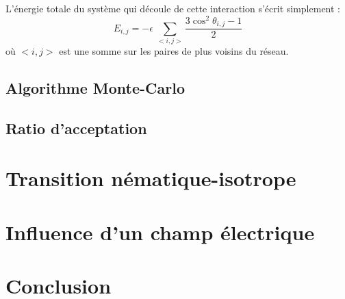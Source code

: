 \documentclass[11pt,a4paper]{article}
\numberwithin{equation}{section}
\begin{document}
L'énergie totale du système qui découle de cette interaction s'écrit simplement :
\begin{equation}
E_{i,j} = - \epsilon\ \sum_{<i,j>} \frac{3\cos^2\theta_{i,j}-1}{2}
\end{equation}
où $<i,j>$ est une somme sur les paires de plus voisins du réseau.

\subsection{Algorithme Monte-Carlo}


\subsection{Ratio d'acceptation}


\newpage
\section{Transition nématique-isotrope}




\newpage
\section{Influence d'un champ électrique}


\newpage
\section*{Conclusion}
\end{document}
